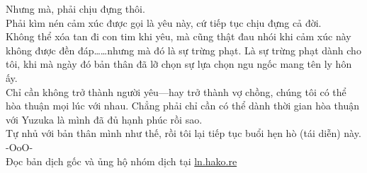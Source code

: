 \documentclass[12pt,a4paper, twosides]{book}
\begin{document}
Nhưng mà, phải chịu đựng thôi.\\
Phải kìm nén cảm xúc được gọi là yêu này, cứ tiếp tục chịu đựng cả đời.\\
Không thể xóa tan đi con tim khi yêu, mà cũng thật đau nhói khi cảm xúc này không được đền đáp……nhưng mà đó là sự trừng phạt. Là sự trừng phạt dành cho tôi, khi mà ngày đó bản thân đã lỡ chọn sự lựa chọn ngu ngốc mang tên ly hôn ấy.\\
Chỉ cần không trở thành người yêu—hay trở thành vợ chồng, chúng tôi có thể hòa thuận mọi lúc với nhau. Chẳng phải chỉ cần có thể dành thời gian hòa thuận với Yuzuka là mình đã đủ hạnh phúc rồi sao.\\
Tự nhủ với bản thân mình như thế, rồi tôi lại tiếp tục buổi hẹn hò (tái diễn) này.\\
-OoO-\\
Đọc bản dịch gốc và ủng hộ nhóm dịch tại \href{https://ln.hako.re/}{ln.hako.re}\\
\newpage
\end{document}
